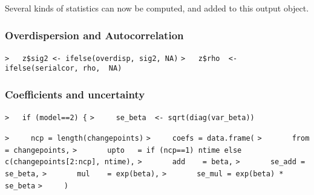 \documentclass[a4paper]{article}
\begin{document}
Several kinds of statistics can now be computed, and added to this output object.\par



\subsubsection{Overdispersion and Autocorrelation}\par

\verb~>   z$sig2 <- ifelse(overdisp, sig2, NA)~\newline
\verb~>   z$rho  <- ifelse(serialcor, rho,  NA)~\par



\subsubsection{Coefficients and uncertainty}\par

\verb~>   if (model==2) {~\newline
\verb~>     se_beta  <- sqrt(diag(var_beta))~\par

\verb~>     ncp = length(changepoints)~\newline
\verb~>     coefs = data.frame(~\newline
\verb~>       from   = changepoints,~\newline
\verb~>       upto   = if (ncp==1) ntime else c(changepoints[2:ncp], ntime),~\newline
\verb~>       add    = beta,~\newline
\verb~>       se_add = se_beta,~\newline
\verb~>       mul    = exp(beta),~\newline
\verb~>       se_mul = exp(beta) * se_beta~\newline
\verb~>     )~\par
\end{document}
